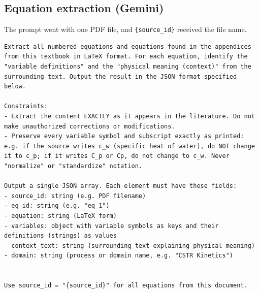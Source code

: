 \subsection*{Equation extraction (Gemini)}
The prompt went with one PDF file, and \texttt{\{source\_id\}} received the file name.
\begin{Verbatim}[fontsize=\scriptsize, breaklines=true, frame=single]
Extract all numbered equations and equations found in the appendices from this textbook in LaTeX format. For each equation, identify the "variable definitions" and the "physical meaning (context)" from the surrounding text. Output the result in the JSON format specified below.

Constraints:
- Extract the content EXACTLY as it appears in the literature. Do not make unauthorized corrections or modifications.
- Preserve every variable symbol and subscript exactly as printed: e.g. if the source writes c_w (specific heat of water), do NOT change it to c_p; if it writes C_p or Cp, do not change to c_w. Never "normalize" or "standardize" notation.

Output a single JSON array. Each element must have these fields:
- source_id: string (e.g. PDF filename)
- eq_id: string (e.g. "eq_1")
- equation: string (LaTeX form)
- variables: object with variable symbols as keys and their definitions (strings) as values
- context_text: string (surrounding text explaining physical meaning)
- domain: string (process or domain name, e.g. "CSTR Kinetics")


Use source_id = "{source_id}" for all equations from this document.
\end{Verbatim}

